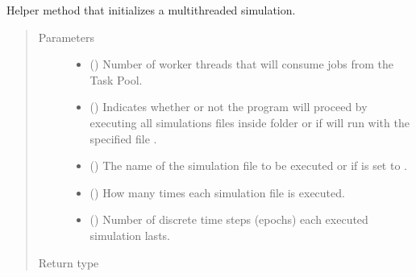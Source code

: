 \documentclass[letterpaper,10pt,english]{sphinxmanual}
\begin{document}
\begin{fulllineitems}
\label{\detokenize{app:app.hive_simulation._parallel_main}}
Helper method that initializes a multi\sphinxhyphen{}threaded simulation.
\begin{quote}\begin{description}
\item[{Parameters}] \leavevmode\begin{itemize}
\item {} 
 () \textendash{} Number of worker threads that will consume jobs from the Task Pool.

\item {} 
 () \textendash{} Indicates whether or not the program will proceed by executing
all simulations files inside
{\hyperref[\detokenize{app:app.environment_settings.SIMULATION_ROOT}]{}} folder or
if will run with the specified file .

\item {} 
 (\sphinxstyleliteralemphasis{\sphinxupquote{{[}}}\sphinxstyleliteralemphasis{\sphinxupquote{{]}}}) \textendash{} The name of the simulation file to be executed or  if
 is set to .

\item {} 
 () \textendash{} How many times each simulation file is executed.

\item {} 
 () \textendash{} Number of discrete time steps (epochs) each executed simulation
lasts.

\end{itemize}

\item[{Return type}] \leavevmode
{}

\end{description}\end{quote}

\end{fulllineitems}
\end{document}
